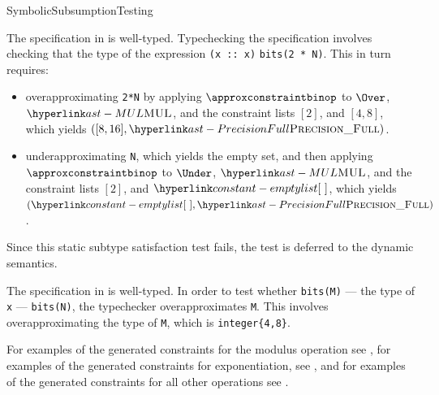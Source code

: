 \begin{TypingRuleList}{SymbolicSubsumptionTesting}

The specification in  is well-typed.
Typechecking the specification involves checking that the type of
the expression \verb|(x :: x)| \subtypesatisfiesterm{} \verb|bits(2 * N)|.
This in turn requires:
\begin{itemize}
\item overapproximating \verb|2*N| by applying $\approxconstraintbinop$
      to $\Over$, $\MUL$, and the constraint lists $[2]$, and $[4,8]$,
      which yields $([8, 16], \PrecisionFull)$.

\item underapproximating \verb|N|, which yields the empty set,
      and then applying \\
      $\approxconstraintbinop$
      to $\Under$, $\MUL$, and the constraint lists $[2]$, and $\emptylist$,
      which yields $(\emptylist, \PrecisionFull)$.
\end{itemize}
Since this static subtype satisfaction test fails, the test is deferred to
the dynamic semantics.





The specification in  is well-typed.
In order to test whether \verb|bits(M)| --- the type of \verb|x| --- \subtypesatisfiesterm{}
\verb|bits(N)|, the typechecker overapproximates \verb|M|.
This involves overapproximating the type of \verb|M|, which is \verb|integer{4,8}|.




For examples of the generated constraints
for the modulus operation see ,
for examples of the generated constraints for exponentiation,
see ,
and for examples of the generated constraints for all other operations
see .



\end{TypingRuleList}
